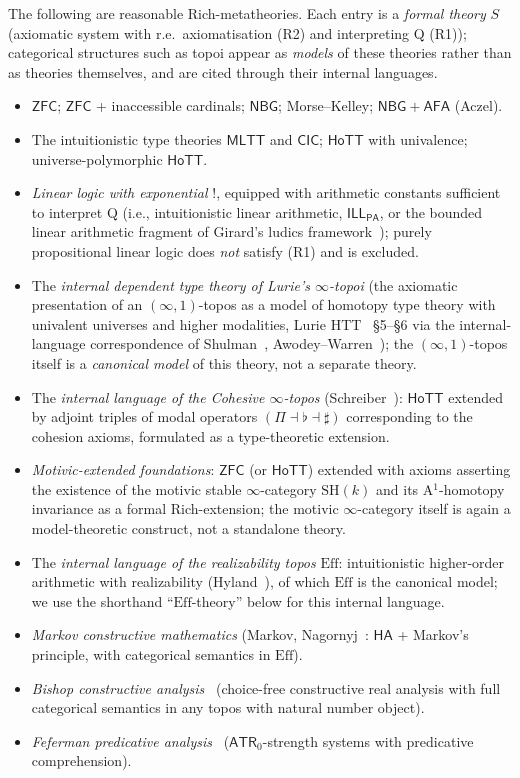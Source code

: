 \documentclass[11pt]{article}
\theoremstyle{plain}
\theoremstyle{definition}
\newcommand{\ZFC}{\mathsf{ZFC}}
\newcommand{\MLTT}{\mathsf{MLTT}}
\newcommand{\HoTT}{\mathsf{HoTT}}
\newcommand{\CIC}{\mathsf{CIC}}
\newcommand{\NBG}{\mathsf{NBG}}
\newcommand{\AFA}{\mathsf{AFA}}
\begin{document}
The following are reasonable Rich-metatheories. Each entry is a \emph{formal theory} $S$ (axiomatic system with r.e.\ axiomatisation (R2) and interpreting Q (R1)); categorical structures such as topoi appear as \emph{models} of these theories rather than as theories themselves, and are cited through their internal languages.
\begin{itemize}
\item $\ZFC$; $\ZFC$ + inaccessible cardinals; $\NBG$; Morse--Kelley; $\NBG + \AFA$ (Aczel).
\item The intuitionistic type theories $\MLTT$ and $\CIC$; $\HoTT$ with univalence; universe-polymorphic $\HoTT$.
\item \emph{Linear logic with exponential} $!$, equipped with arithmetic constants sufficient to interpret Q (i.e., intuitionistic linear arithmetic, $\mathsf{ILL}_{\mathsf{PA}}$, or the bounded linear arithmetic fragment of Girard's ludics framework~\cite{Girard2001}); purely propositional linear logic does \emph{not} satisfy (R1) and is excluded.
\item The \emph{internal dependent type theory of Lurie's $\infty$-topoi} (the axiomatic presentation of an $(\infty, 1)$-topos as a model of homotopy type theory with univalent universes and higher modalities, Lurie HTT~\cite{LurieHTT} \S 5--\S 6 via the internal-language correspondence of Shulman~\cite{Shulman2019}, Awodey--Warren~\cite{AwodeyWarren2009}); the $(\infty, 1)$-topos itself is a \emph{canonical model} of this theory, not a separate theory.
\item The \emph{internal language of the Cohesive $\infty$-topos} (Schreiber~\cite{Schreiber2013}): $\HoTT$ extended by adjoint triples of modal operators $(\Pi \dashv \flat \dashv \sharp)$ corresponding to the cohesion axioms, formulated as a type-theoretic extension.
\item \emph{Motivic-extended foundations}: $\ZFC$ (or $\HoTT$) extended with axioms asserting the existence of the motivic stable $\infty$-category $\mathrm{SH}(k)$ and its A$^1$-homotopy invariance as a formal Rich-extension; the motivic $\infty$-category itself is again a model-theoretic construct, not a standalone theory.
\item The \emph{internal language of the realizability topos} $\mathrm{Eff}$: intuitionistic higher-order arithmetic with realizability (Hyland~\cite{Hyland1982}), of which $\mathrm{Eff}$ is the canonical model; we use the shorthand ``$\mathrm{Eff}$-theory'' below for this internal language.
\item \emph{Markov constructive mathematics} (Markov, Nagornyj~\cite{MarkovNagornyj1988}: $\mathsf{HA}$ + Markov's principle, with categorical semantics in $\mathrm{Eff}$).
\item \emph{Bishop constructive analysis}~\cite{Bishop1967,BridgesVita2006} (choice-free constructive real analysis with full categorical semantics in any topos with natural number object).
\item \emph{Feferman predicative analysis}~\cite{Feferman1964} ($\mathsf{ATR}_0$-strength systems with predicative comprehension).
\end{itemize}
\end{document}
